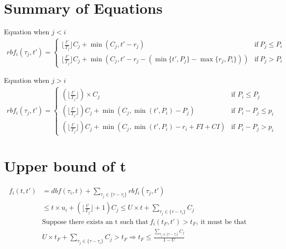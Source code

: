 \documentclass[12pt,conference,onecolumn]{IEEEtran}
\begin{document}
\section{Summary of Equations}



Equation when $j<i$
\begin{equation}
\label{eqn:unnecessary}
\begin{split}
rbf_i(\tau_j,t')=
\begin{cases}
\lfloor \frac{t'}{T_j} \rfloor C_j +\min(C_j,t'-r_j)&\mbox{if}~ P_j\leq P_i\\
\lfloor \frac{t'}{T_j} \rfloor C_j +\min\left(C_j,t'-r_j-\left(\min\{t',P_j\}-\max\{r_j,P_i\}\right)\right)&\mbox{if}~ P_j>P_i
\end{cases}
\end{split}
\end{equation}


Equation when $j>i$
\begin{equation} 
\label{eqn:unnecessary}
\begin{split}
rbf_i(\tau_j,t')=
\begin{cases}
(\lfloor \frac{t'}{T_j} \rfloor)\times C_j&\mbox{if~} P_i\leq P_j\\
(\lfloor \frac{t'}{T_j} \rfloor) C_j+\min\left(C_j,\min(t', P_i)-P_j\right)&\mbox{if~}P_i-P_j\leq p_i\\
(\lfloor \frac{t'}{T_j} \rfloor) C_j+\min(C_j, \min(t', P_i)-r_{i}+FI+CI)&\mbox{if~}P_i- P_j>p_i
\end{cases}
\end{split}
\end{equation}
\section{Upper bound of t}
\begin{align*}
f_i(t,t')&=dbf(\tau_i,t)+\sum_{\tau_j\in\{\tau-\tau_i\}}rbf_i(\tau_j,t')\\
		&\leq t\times u_i+(\lfloor \frac{t'}{T_j} \rfloor+1)C_j\leq U\times t+\sum_{\tau_j\in\{\tau-\tau_i\}}C_j\\
	&\mbox{Suppose there exists an t such that}~f_i(t_F,t')>t_F,~\mbox{it must be that}\\
	&U\times t_F+\sum_{\tau_j\in\{\tau-\tau_i\}}C_j>t_F\Rightarrow t_F\leq \frac{\sum_{\tau_j\in\{\tau-\tau_i\}}C_j}{1-U}
\end{align*}
\end{document}
